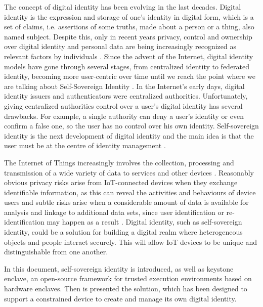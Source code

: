 
The concept of digital identity has been evolving in the last decades. Digital identity is the expression and storage of one's identity in digital form, which is a set of claims, i.e. assertions of some truths, made about a person or a thing, also named subject. Despite this, only in recent years privacy, control and ownership over digital identity and personal data are being increasingly recognized as relevant factors by individuals \cite{TheLawsOfIdentity}. 
Since the advent of the Internet, digital identity models have gone through several stages, from centralized identity to federated identity, becoming more user-centric over time until we reach the point where we are talking about Self-Sovereign Identity \cite{ThePathToSSI}.
In the Internet's early days, digital identity issuers and authenticators were centralized authorities. Unfortunately, giving centralized authorities control over a user's digital identity has several drawbacks. For example, a single authority can deny a user's identity or even confirm a false one, so the user has no control over his own identity. Self-sovereign identity is the next development of digital identity and the main idea is that the user must be at the centre of identity management \cite{ThePathToSSI}.


The Internet of Things increasingly involves the collection, processing and transmission of a wide variety of data to services and other devices \cite{wilson2018digital}. Reasonably obvious privacy risks arise from IoT-connected devices when they exchange identifiable information, as this can reveal the activities and behaviours of device users and subtle risks arise when a considerable amount of data is available for analysis and linkage to additional data sets, since user identification or re-identification may happen as a result \cite{wilson2018digital}. Digital identity, such as self-sovereign identity, could be a solution for building a digital realm where heterogeneous objects and people interact securely. This will allow IoT devices to be unique and distinguishable from one another.


In this document, self-sovereign identity is introduced, as well as keystone enclave, an open-source framework for trusted execution environments based on hardware enclaves. Then is presented the solution, which has been designed to support a constrained device to create and manage its own digital identity. 



